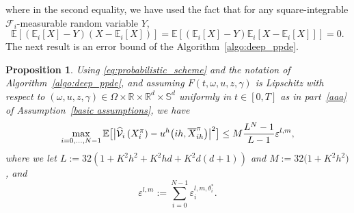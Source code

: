 \documentclass[12pt]{article}
\newtheorem{prop}{Proposition}[section]
\numberwithin{equation}{section}
\newcommand{\E}{\mathbb{E}}
\newcommand{\real}{\mathbb{R}}
\begin{document}
where in the second equality, we have used the fact that
for any square-integrable $\mathcal{F}_i$-measurable random variable $Y$,
\[
\E [ (\E_i [X] -Y) (X - \E_i[X])] = \E [(\E_i[X] -Y)\E_i [ X - \E_i[X] ] ] = 0.
\]
 The next result is an error bound of the Algorithm~\ref{algo:deep_ppde}.
 \begin{prop}
   \label{theo:deep_scheme_nonlinear}
  Using \eqref{eq:probabilistic_scheme} and the notation of
   Algorithm~\ref{algo:deep_ppde},
  and assuming
 $F (t, \omega, u, z, \gamma)$ is
	  Lipschitz with respect to $(\omega, u, z, \gamma)
          \in \Omega \times \real \times \real^d \times \mathbb{S}^d$
	  uniformly in $t \in [0,T]$
          as in
  part~\eqref{aaa} of Assumption~\ref{basic assumptions},
 we have
 \begin{align}
   \nonumber %
    \max_{i=0,\ldots,N-1} \E \big[ \big|\widehat{\cal V}_{i}\left(X^\pi_i \right) - u^h\big(ih, \overline{X}^\pi_{ih}\big)\big|^2 \big] \leq M \frac{L^N - 1}{L-1}\varepsilon^{l ,m},
\end{align}
where we let $L := 32\left(1+K^2h^2 + K^2hd + K^2 d(d+1) \right)$ and $M := 32\big(1 + K^2h^2\big)$, and
\begin{equation}
  \label{gfjkfld}
\varepsilon^{l,m} := \sum\limits_{i = 0}^{N-1} \varepsilon_i^{{l,m}, \theta_i^*}.
\end{equation}
\end{prop}
\end{document}
